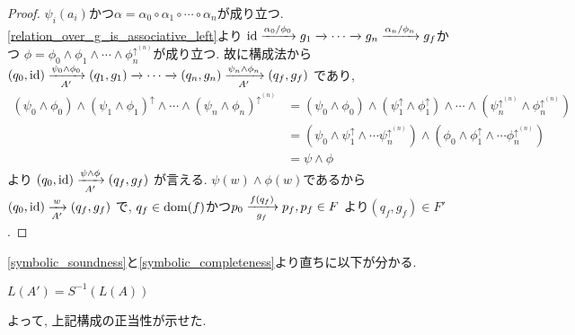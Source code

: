 \documentclass[uplatex,dvipdfmx,a4j]{jsreport}
\begin{document}
\begin{proof}
    $\psi_i(a_i)$かつ$\alpha = \alpha_0 \circ \alpha_1 \circ \cdots \circ \alpha_n$が成り立つ.
    \ref{relation_over_g_is_associative_left}より
    $\id \transarrow{\alpha_0 / \phi_0}{} g_1 \transarrow{}{} \cdots
    \transarrow{}{} g_n \transarrow{\alpha_n / \phi_n}{} g_f$かつ
    $\phi = \phi_0 \land \phi_1 \land \cdots \land \phi_n^{\uparrow^{(n)}}$が成り立つ.
    故に構成法から
    $(q_0, \id) \transarrow{\psi_0 \land \phi_0}{A'} (q_1, g_1) \transarrow{}{} \cdots
    \transarrow{}{} (q_n, g_n) \transarrow{\psi_n \land \phi_n}{A'} (q_f, g_f)$
    であり,
    \begin{align*}
      (\psi_0 \land \phi_0) \land (\psi_1 \land \phi_1)^\uparrow \land \cdots
      \land (\psi_n \land \phi_n)^{\uparrow^{(n)}} &=
      (\psi_0 \land \phi_0) \land (\psi_1^\uparrow \land \phi_1^\uparrow) \land \cdots
      \land (\psi_n^{\uparrow^{(n)}} \land \phi_n^{\uparrow^{(n)}}) \\
      &= (\psi_0 \land \psi_1^\uparrow \land \cdots \psi_n^{\uparrow^{(n)}}) \land
      (\phi_0 \land \phi_1^\uparrow \land \cdots \phi_n^{\uparrow^{(n)}}) \\
      &= \psi \land \phi
    \end{align*}
    より
    $(q_0, \id) \transarrow{\psi \land \phi}{A'} (q_f, g_f)$
    が言える.
    $\psi(w) \land \phi(w)$であるから
    $(q_0, \id) \transarrow{w}{A'} (q_f, g_f)$
    で, $q_f \in \dom(f)$かつ$p_0 \transarrow{f(q_f)}{g_f} p_f, p_f \in F$
    より$(q_f, g_f) \in F'$.
  \end{proof}

  \ref{symbolic_soundness}と\ref{symbolic_completeness}より直ちに以下が分かる.

  \begin{theorem}
    $L(A') = S^{-1}(L(A))$
  \end{theorem}

  よって, 上記構成の正当性が示せた.
\end{document}
